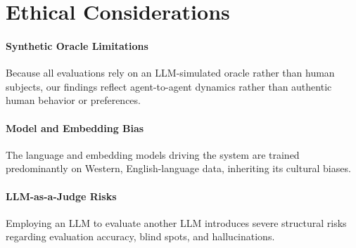 \section{Ethical Considerations}\label{sec:ethics}

\paragraph{Synthetic Oracle Limitations}
Because all evaluations rely on an LLM-simulated oracle rather than human subjects, our findings reflect agent-to-agent dynamics rather than authentic human behavior or preferences.

\paragraph{Model and Embedding Bias}
The language and embedding models driving the system are trained predominantly on Western, English-language data, inheriting its cultural biases. 

\paragraph{LLM-as-a-Judge Risks}
Employing an LLM to evaluate another LLM introduces severe structural risks regarding evaluation accuracy, blind spots, and hallucinations.